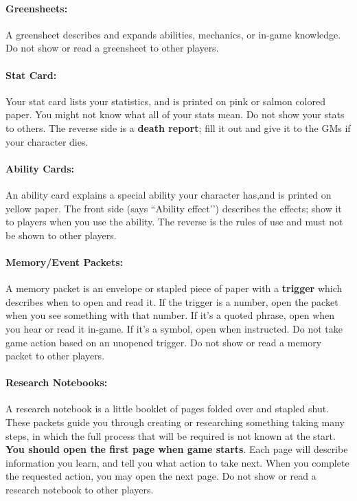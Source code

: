 \documentclass[sheet]{GL2020}
\begin{document}
\paragraph{Greensheets:} A greensheet describes and expands abilities, mechanics, or in-game knowledge. Do not show or read a greensheet to other players.

\paragraph{Stat Card:} Your stat card lists your statistics, and is printed on pink or salmon colored paper. You might not know what all of your stats mean. Do not show your stats to others. The reverse side is a {\bf death report}; fill it out and give it to the GMs if your character dies.

\paragraph{Ability Cards:} An ability card explains a special ability your character has,and is printed on yellow paper. The front side (says ``Ability effect’’) describes the effects; show it to players when you use the ability.  The reverse is the rules of use and must not be shown to other players.

\paragraph{Memory/Event Packets:} A memory packet is an envelope or stapled piece of paper with a {\bf trigger} which describes when to open and read it. If the trigger is a number, open the packet when you see something with that number. If it's a quoted phrase, open when you hear or read it in-game.  If it's a symbol, open when instructed. Do not take game action based on an unopened trigger. Do not show or read a memory packet to other players.

\paragraph{Research Notebooks:} A research notebook is a little booklet of pages folded over and stapled shut. These packets guide you through creating or researching something taking many steps, in which the full process that will be required is not known at the start. \textbf{You should open the first page when game starts}. Each page will describe information you learn, and tell you what action to take next. When you complete the requested action, you may open the next page. Do not show or read a research notebook to other players. 
\end{document}
